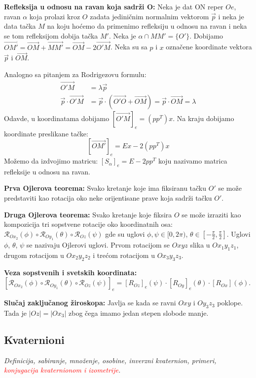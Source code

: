 \documentclass[12pt]{article}
\newcommand{\vek}[1]{\overrightarrow{#1}}
\newcommand{\ocena}[1]{\textcolor{red}{#1}}
\begin{document}
\textbf{Refleksija u odnosu na ravan koja sadrži O:}
\label{refleksija_u_odnosu_na_ravan} Neka je dat ON reper $Oe$,
ravan $\alpha$ koja prolazi kroz $O$ zadata jediničnim normalnim vektorom
$\vek{p}$ i neka je data tačka $M$ na koju hoćemo da primenimo refleksiju u
odnosu na ravan i neka se tom refleksijom dobija tačka $M'$. Neka je
$\alpha\cap MM'=\{O'\}$. Dobijamo
$\vek{OM'}=\vek{OM}+\vek{MM'}=\vek{OM}-2\vek{O'M}$. Neka su sa $p$ i $x$
označene koordinate vektora $\vek{p}$ i $\vek{OM}$.

Analogno sa pitanjem za Rodrigezovu formulu:
\begin{align*}
    \vek{O'M}             & =\lambda\vek{p}                                                \\
    \vek{p}\cdot\vek{O'M} & =\vek{p}\cdot(\vek{O'O}+\vek{OM})=\vek{p}\cdot\vek{OM}=\lambda
\end{align*}
Odavde, u koordinatama dobijamo $[\vek{O'M}]_e=(pp^T)x$. Na kraju dobijamo
koordinate preslikane tačke:
$$[\vek{OM'}]_e=Ex-2(pp^T)x$$
Možemo da izdvojimo matricu: $[S_\alpha]_e=E-2pp^T$ koju nazivamo matrica
refleksije u odnosu na ravan.
\par

\textbf{Prva Ojlerova teorema:} Svako kretanje koje ima fiksiranu tačku
$O'$ se može predstaviti kao rotacija oko neke orijentisane
prave koja sadrži tačku $O'$.
\par

\textbf{Druga Ojlerova teorema:} Svako kretanje koje fiksira $O$ se može
izraziti kao kompozicija tri sopstvene rotacije oko koordinatnih osa:
$\mathcal{R}_{Ox_2}(\phi)\circ \mathcal{R}_{Oy_1}(\theta)\circ \mathcal{R}_{Oz}(\psi)$ gde su uglovi
$\phi,\psi\in[0,2\pi)$, $\theta\in[-\frac{\pi}{2},\frac{\pi}{2}]$. Uglovi $\phi$,
$\theta$, $\psi$ se nazivaju Ojlerovi uglovi. Prvom rotacijom se $Oxyz$ slika u
$Ox_1y_1z_1$, drugom rotacijom u $Ox_2y_2z_2$ i trećom rotacijom u $Ox_3y_3z_3$.
\par

\textbf{Veza sopstvenih i svetskih koordinata:}
$[\mathcal{R}_{Ox_2}(\phi)\circ \mathcal{R}_{Oy_1}(\theta)\circ \mathcal{R}_{Oz}(\psi)]_e=[R_{Oz}]_e(\psi)\cdot [R_{Oy}]_e(\theta)\cdot [R_{Ox}](\phi)$.
\par

\textbf{Slučaj zaključanog žiroskopa:} Javlja se kada se ravni
$Oxy$ i $Oy_3z_3$ poklope. Tada je $|Oz|=|Ox_3|$ zbog čega imamo jedan stepen slobode manje.

\subsection{Kvaternioni}
\textit{Definicija, sabiranje, množenje, osobine, inverzni
    kvaternion, primeri, \ocena{konjugacija kvaternionom i izometrije}.}
\par
\vspace*{1cm}
\end{document}
